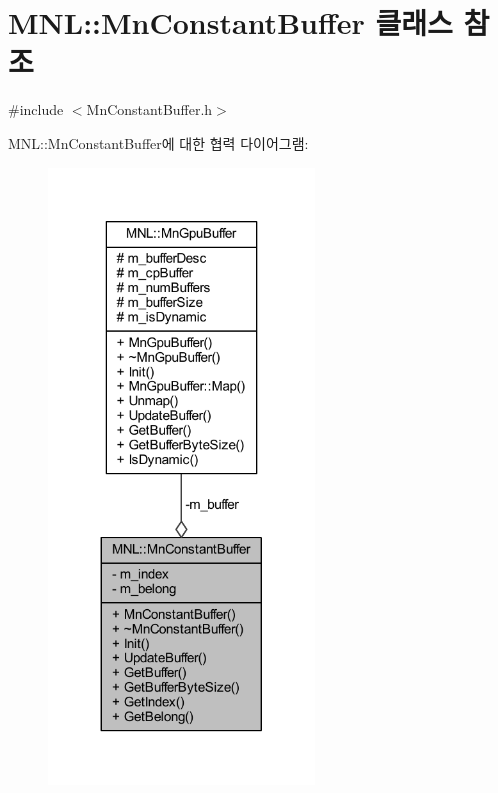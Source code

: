 \hypertarget{class_m_n_l_1_1_mn_constant_buffer}{}\section{M\+NL\+:\+:Mn\+Constant\+Buffer 클래스 참조}
\label{class_m_n_l_1_1_mn_constant_buffer}


{\ttfamily \#include $<$Mn\+Constant\+Buffer.\+h$>$}



M\+NL\+:\+:Mn\+Constant\+Buffer에 대한 협력 다이어그램\+:\nopagebreak
\begin{figure}[H]
\begin{center}
\leavevmode
\includegraphics[width=200pt]{class_m_n_l_1_1_mn_constant_buffer__coll__graph}
\end{center}
\end{figure}
